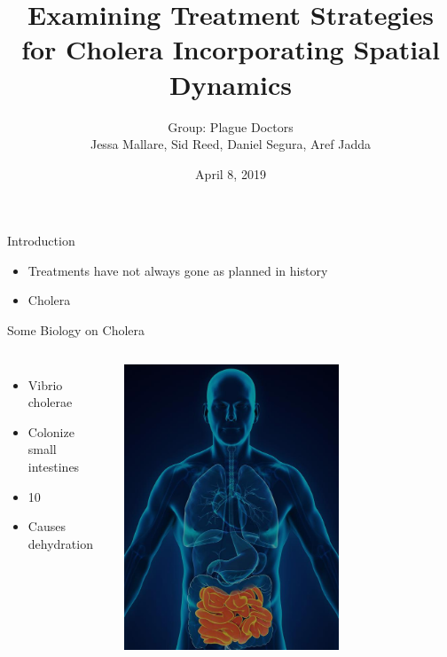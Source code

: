 \documentclass{beamer}\usepackage[]{graphicx}\usepackage[]{color}
\title[Modelling Cholera Treatments]
{Examining Treatment Strategies for Cholera Incorporating Spatial Dynamics}
\author[Plague Doctors]{Group: Plague Doctors \\ Jessa Mallare, Sid Reed, Daniel Segura, Aref Jadda}
\institute[McMaster]{McMaster University \and
Instructor: Dr. David Earn}
\date[April 8, 2019]{April 8, 2019}
\begin{document}
\begin{frame}
\titlepage
\end{frame}

\begin{frame}{Introduction}
\begin{itemize}
\setlength\itemsep{2em}
\item Treatments have not always gone as planned in history
\item Cholera
\end{itemize}
\end{frame}

\begin{frame}{Some Biology on Cholera}
\begin{columns}[onlytextwidth]
\begin{itemize}
\setlength\itemsep{2em}
\item Vibrio cholerae
\item Colonize small intestines
\item 10%
\item Causes dehydration
\end{itemize}
\includegraphics[width=0.65\textwidth]{SI.jpg}
\end{columns}
\end{frame}
\end{document}
